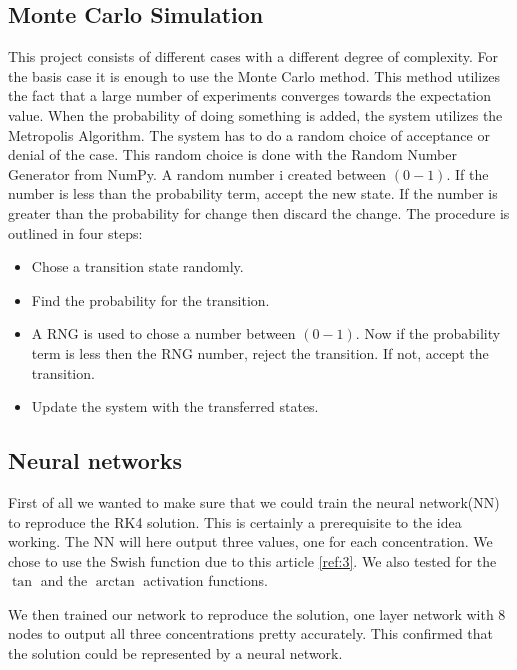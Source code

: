 \subsection{Monte Carlo Simulation}

This project consists of different cases with a different degree of complexity. For the basis case it is enough to use the Monte Carlo method. This method utilizes the fact that a large number of experiments converges towards the expectation value. When the probability of doing something is added, the system utilizes the Metropolis Algorithm. The system has to do a random choice of acceptance or denial of the case. This random choice is done with the Random Number Generator from NumPy\cite{NumPy}. A random number i created between $(0 - 1)$. If the number is less than the probability term, accept the new state. If the number is greater than the probability for change then discard the change. The procedure is outlined in four steps:

\begin{itemize}
	\item Chose a transition state randomly.
	\item Find the probability for the transition.
	\item A RNG is used to chose a number between $(0-1)$. Now if the probability term is less then the RNG number, reject the transition. If not, accept the transition.
	\item Update the system with the transferred states.
\end{itemize}



\subsection{Neural networks}

	First of all we wanted to make sure that we could  train the neural network(NN) to reproduce the RK4 solution. This is certainly a prerequisite to the idea working. The NN will here output three values, one for each concentration. We chose to use the Swish function due to this article \ref{ref:3}. We also tested for the $\tan$ and the $\arctan$ activation functions.
	
	We then trained our network to reproduce the solution, one layer network with 8 nodes to output all three concentrations pretty accurately. This confirmed that the solution could be represented by a neural network.
	
